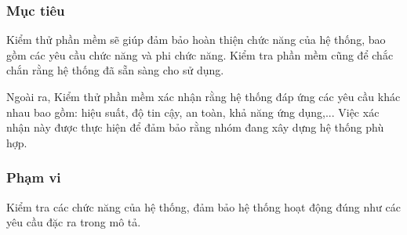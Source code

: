 \subsubsection{Mục tiêu}
Kiểm thử phần mềm sẽ giúp đảm bảo hoàn thiện chức năng của hệ thống, bao gồm các yêu cầu chức năng và phi chức năng. Kiểm tra phần mềm cũng để chắc chắn rằng hệ thống đã sẵn sàng cho sử dụng.\par

Ngoài ra, Kiểm thử phần mềm xác nhận rằng hệ thống đáp ứng các yêu cầu khác nhau bao gồm: hiệu suất, độ tin cậy, an toàn, khả năng ứng dụng,... Việc xác nhận này được thực hiện để đảm bảo rằng nhóm đang xây dựng hệ thống phù hợp.

\subsubsection{Phạm vi}
Kiểm tra các chức năng của hệ thống, đảm bảo hệ thống hoạt động đúng như các yêu cầu đặc ra trong mô tả.

